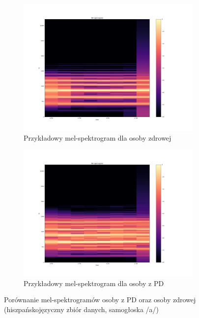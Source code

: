 \begin{figure}[ht]
    \centering
    \begin{subfigure}{0.49\textwidth}
        \centering
        \includegraphics[width=\textwidth]{./img/spectrograms/HC_a}
        \caption{Przykładowy mel-spektrogram dla osoby zdrowej\@}
        \label{fig:melspectrogram_HC}
    \end{subfigure}
    \begin{subfigure}{0.49\textwidth}
        \centering
        \includegraphics[width=\textwidth]{./img/spectrograms/PD_a}
        \caption{Przykładowy mel-spektrogram dla osoby z PD\@}
        \label{fig:melspectrogram_PD}
    \end{subfigure}

    \caption{Porównanie mel-spektrogramów osoby z PD oraz osoby zdrowej (hiszpańskojęzyczny zbiór danych, samogłoska /a/)}
    \label{fig:melspectrograms}
\end{figure}

